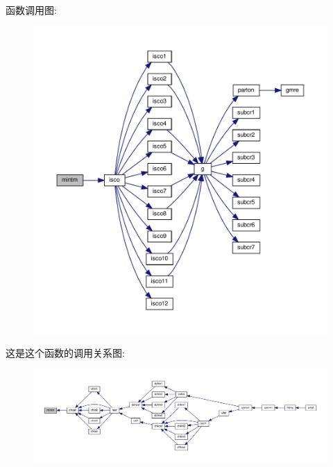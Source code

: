 函数调用图\+:
\nopagebreak
\begin{figure}[H]
\begin{center}
\leavevmode
\includegraphics[width=350pt]{mintm_8f90_ad992029fdfa78ca208231e1c9e2aa0a1_cgraph}
\end{center}
\end{figure}
这是这个函数的调用关系图\+:
\nopagebreak
\begin{figure}[H]
\begin{center}
\leavevmode
\includegraphics[width=350pt]{mintm_8f90_ad992029fdfa78ca208231e1c9e2aa0a1_icgraph}
\end{center}
\end{figure}
